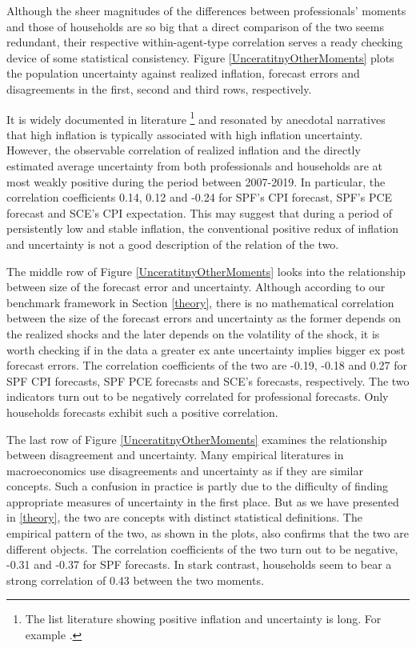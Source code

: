\documentclass[12pt]{article}
\begin{document}
	Although the sheer magnitudes of the differences between professionals' moments and those of households are so big that a direct comparison of the two seems redundant, their respective within-agent-type correlation serves a ready checking device of some statistical consistency. Figure \ref{UnceratitnyOtherMoments} plots the population uncertainty against realized inflation,  forecast errors and disagreements in the first, second and third rows, respectively. 
	
	It is widely documented in literature \footnote{The list literature showing positive inflation and uncertainty is long. For example \citet{ball1990inflation}. } and resonated by anecdotal narratives that high inflation is typically associated with high inflation uncertainty. However, the observable correlation of realized inflation and the directly estimated average uncertainty from both professionals and households are at most weakly positive during the period between 2007-2019. In particular, the correlation coefficients  0.14, 0.12 and -0.24 for SPF's CPI forecast, SPF's PCE forecast and SCE's CPI expectation. This may suggest that during a period of persistently low and stable inflation, the conventional positive redux of inflation and uncertainty is not a good description of the relation of the two. 
	
	The middle row of Figure \ref{UnceratitnyOtherMoments} looks into the relationship between size of the forecast error and uncertainty. Although according to our benchmark framework in Section \ref{theory}, there is no mathematical correlation between the size of the forecast errors and uncertainty as the former depends on the realized shocks and the later depends on the volatility of the shock, it is worth checking if in the data a greater ex ante uncertainty implies bigger ex post forecast errors. The correlation coefficients of the two are -0.19, -0.18 and 0.27 for SPF CPI forecasts, SPF PCE forecasts and SCE's forecasts, respectively. The two indicators turn out to be negatively correlated for professional forecasts. Only households forecasts exhibit such a positive correlation.   
	
	The last row of Figure \ref{UnceratitnyOtherMoments} examines the relationship between disagreement and uncertainty. Many empirical literatures in macroeconomics use disagreements and uncertainty as if they are similar concepts. Such a confusion in practice is partly due to the difficulty of finding appropriate measures of uncertainty in the first place. But as we have presented in \ref{theory}, the two are concepts with distinct statistical definitions. The empirical pattern of the two,  as shown in the plots, also confirms that the two are different objects. The correlation coefficients of the two turn out to be negative, -0.31 and -0.37 for SPF forecasts. In stark contrast, households seem to bear a strong correlation of 0.43 between the two moments.  
	
\end{document}
